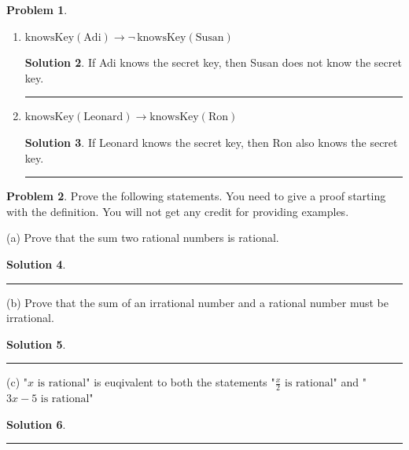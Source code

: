 \documentclass{article}
\theoremstyle{definition}
\newtheorem{problem}{Problem}
\def\fline{\rule{0.75\linewidth}{0.5pt}}
\newcommand{\finishline}{\begin{center}\fline\end{center}}
\newtheorem*{solution*}{Solution}
\newenvironment{solution}{\begin{solution*}}{{\finishline} \end{solution*}}
\begin{document}
\begin{problem}
\begin{enumerate}[label=(\roman*)]
        \begin{solution}

If Whit knows the secret key, then Adi also knows the secret key.

        \end{solution}
        \item $\text{knowsKey}(\text{Adi}) \rightarrow \neg\,\text{knowsKey}(\text{Susan})$

        \begin{solution}

If Adi knows the secret key, then Susan does not know the secret key.

        \end{solution}
        \item $\text{knowsKey}(\text{Leonard}) \rightarrow \text{knowsKey}(\text{Ron})$

        \begin{solution}

If Leonard knows the secret key, then Ron also knows the secret key.

        \end{solution}
    \end{enumerate}
\end{problem}


\begin{problem}
Prove the following statements. You need to give a proof starting with the definition. You will not get any credit for providing examples.

(a) Prove that the sum two rational numbers is rational.

\begin{solution}



\end{solution}

(b) Prove that the sum of an irrational number and a rational number must be irrational.

\begin{solution}



\end{solution}

(c) "$x \text{ is rational}$" is euqivalent to both the statements "$\frac{x}{2} \text{ is rational}$" and  "$3x-5 \text{ is rational}$" 

\begin{solution}



\end{solution}


\end{problem}
\end{document}
